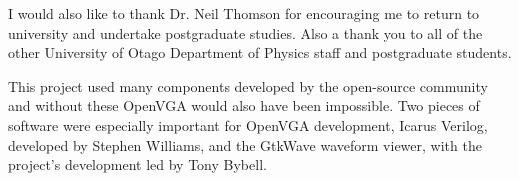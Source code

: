 \documentclass[a4paper,10pt]{report}
\begin{document}
I would also like to thank Dr. Neil Thomson for encouraging me to return to
university and undertake postgraduate studies. Also a thank you to all of the
other University of Otago Department of Physics staff and postgraduate students.

This project used many components developed by the open-source community and
without these OpenVGA would also have been impossible. Two pieces of software
were especially important for OpenVGA development, Icarus Verilog, developed by
Stephen Williams, and the GtkWave waveform viewer, with the project's development
led by Tony Bybell.



\tableofcontents
\listoftables
\listoffigures

\printglossary



\newcommand\mmodule[6] %
{
\begin{center}
\shadowbox{
\begin{tabular}{l r r r}%
\textbf{Module:}	& \multicolumn{3}{l}{\begin{minipage}[t]{0.7\linewidth}#2\end{minipage}}\\%
\textbf{Description:}	& \multicolumn{3}{l}{\begin{minipage}[t]{0.7\linewidth}\raggedright#3\end{minipage}}\\%
\textbf{Related Files:}	& \multicolumn{3}{l}{\begin{minipage}[t]{0.7\linewidth}\raggedright#4\end{minipage}}\\%
\textbf{Testing Files:}	& \multicolumn{3}{l}{\begin{minipage}[t]{0.7\linewidth}\raggedright#5\end{minipage}}\\%
\textbf{Author:}	& #1 & \multicolumn{2}{r}{\textbf{License:} #6}\\%
\end{tabular}
}
\end{center}
}

\newcommand\ldescript[3]{
\textbf{#1:} & \multicolumn{3}{l}{
		\begin{minipage}[t]{#2\linewidth}\raggedright#3\end{minipage}
    }
}

\newcommand\filedescript[6] %
{
\begin{center} \shadowbox{
	\begin{tabular}{l r r r}%
		\ldescript{File}{0.7}{#2}	\\
		\ldescript{Description}{0.7}{#3}	\\
		\ldescript{Related Files}{0.7}{#4}	\\
		\ldescript{Testing Files}{0.7}{#5}	\\
		\textbf{Author:}	& #1 & \multicolumn{2}{r}{\textbf{License:} #6}\\
	\end{tabular}
}	\end{center}
}
\end{document}
